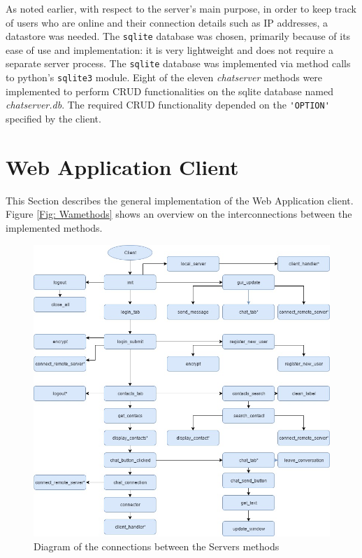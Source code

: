 \documentclass[finalReport.tex]{subfiles}
\begin{document}
As noted earlier, with respect to the server's main purpose, in order to keep track of users who are online and their connection details such as IP addresses, a datastore was needed. The \lstinline'sqlite' database was chosen, primarily because of its ease of use and implementation: it is very lightweight and does not require a separate server process. The \lstinline'sqlite' database was implemented via method calls to python's \lstinline'sqlite3' module. Eight of the eleven \textit{chatserver} methods were implemented to perform CRUD functionalities on the sqlite database named \textit{chatserver.db}. The required CRUD functionality depended on the \lstinline-'OPTION'- specified by the client.




\section{Web Application Client}\label{sec:impl:web-app}
This Section describes the general implementation of the Web Application client. Figure \ref{Fig: Wamethods} shows an overview on the interconnections between the implemented methods.  

\begin{figure}[h] 
\centering
\includegraphics[scale=0.35]{Implementation/Plot/WAmethods.jpg}
\caption{Diagram of the connections between the Servers methods}\label{Fig: WAmethods}
\end{figure}
\end{document}
